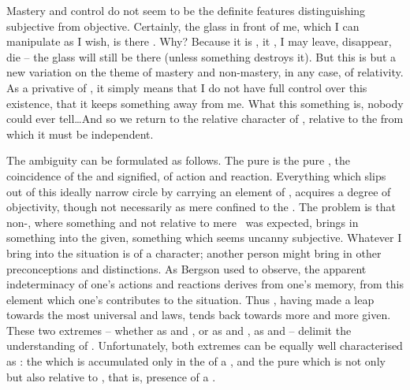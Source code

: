 Mastery and control do not seem to be the definite features distinguishing
{subjective} from {objective}.  Certainly, the glass in front of me, which I can
manipulate as I wish, is there .  Why?  Because it is
, it , I may leave, disappear,
die -- the glass will still be there (unless something destroys it).  But this
 is but a new variation on the theme of mastery and
non-mastery, in any case, of relativity.  As a privative of , it
simply means that I do not have full control over this existence, that it keeps
something away from me. What this something is, nobody could ever tell\ldots And so we return
to the relative character of , relative to the 
from which it must be independent.

\pa The ambiguity can be formulated as follows.  The pure  is
the pure , the coincidence of the  and signified, of
action and reaction. Everything which slips out of this ideally narrow circle by
carrying an element of , acquires a degree of {objectivity},
though not necessarily  as mere  confined to the
\hoa. The problem is that non-, where something 
and not relative to mere \herenow\ was expected, brings in something into the
 given, something which seems uncanny subjective. Whatever I bring into
the  situation is of a  character; another person
might bring in other preconceptions and distinctions. As Bergson used to
observe, the apparent indeterminacy of one's actions and reactions derives from
one's memory, from this  element which one's 
contributes to the  situation.  Thus , having made a
leap towards the most universal and  laws, tends back towards
more and more  given. These two extremes -- whether as 
and , or as  and , as
 and  -- delimit the understanding of
.  Unfortunately, both extremes can be equally well
characterised as : the  which is accumulated
only in the  of a , and the pure  which is
not only  but also relative to \herenow, that is,
presence of a . 

